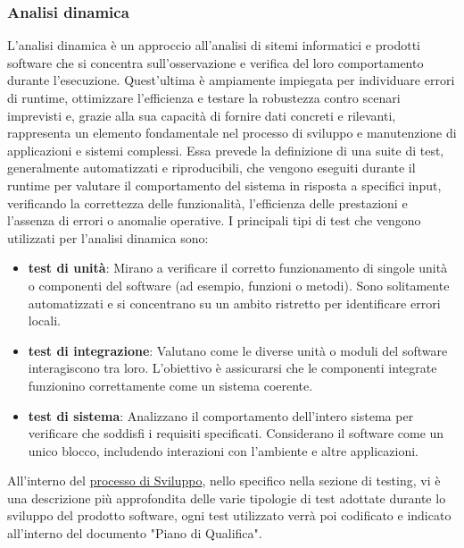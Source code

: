 \subsubsection{Analisi dinamica}
L'analisi dinamica è un approccio all'analisi di sitemi informatici e prodotti software che si concentra sull'osservazione e verifica
del loro comportamento durante l'esecuzione.
Quest'ultima è ampiamente impiegata per individuare errori di runtime, ottimizzare l'efficienza e testare la robustezza contro scenari imprevisti e,
grazie alla sua capacità di fornire dati concreti e rilevanti, rappresenta un elemento fondamentale nel processo di sviluppo e manutenzione di applicazioni e sistemi complessi.
Essa prevede la definizione di una suite di test, generalmente automatizzati e riproducibili, che vengono eseguiti durante il runtime per valutare il comportamento del sistema in risposta a specifici input, 
verificando la correttezza delle funzionalità, l'efficienza delle prestazioni e l'assenza di errori o anomalie operative.
I principali tipi di test che vengono utilizzati per l'analisi dinamica sono: 
\begin{itemize}
    \item \textbf{test di unità}: Mirano a verificare il corretto funzionamento di singole unità o componenti del software (ad esempio, funzioni o metodi). 
    Sono solitamente automatizzati e si concentrano su un ambito ristretto per identificare errori locali.
    \item \textbf{test di integrazione}: Valutano come le diverse unità o moduli del software interagiscono tra loro. 
    L'obiettivo è assicurarsi che le componenti integrate funzionino correttamente come un sistema coerente.
    \item \textbf{test di sistema}: Analizzano il comportamento dell'intero sistema per verificare che soddisfi i requisiti specificati. 
    Considerano il software come un unico blocco, includendo interazioni con l'ambiente e altre applicazioni.
\end{itemize}
All'interno del \hyperref[subsection:processo_sviluppo]{processo di Sviluppo}, nello specifico nella sezione di testing, vi è una descrizione 
più approfondita delle varie tipologie di test adottate durante lo sviluppo del prodotto software, ogni test utilizzato verrà poi 
codificato e indicato all'interno del documento "Piano di Qualifica".
